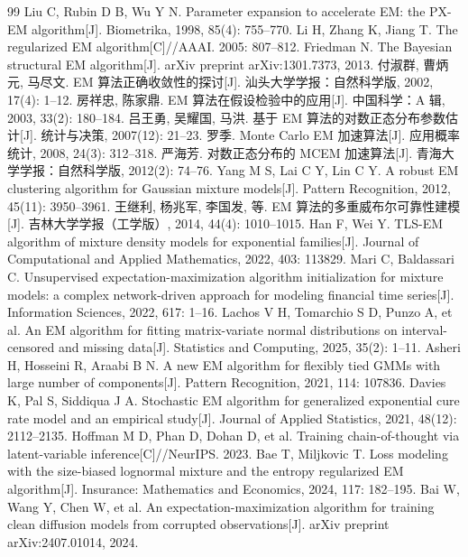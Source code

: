 \documentclass[12pt,a4paper]{ctexart}
\numberwithin{figure}{section}
\numberwithin{table}{section}
\begin{document}
\begin{thebibliography}{99}
   Liu C, Rubin D B, Wu Y N. Parameter expansion to accelerate EM: the PX-EM algorithm[J]. Biometrika, 1998, 85(4): 755--770.
   Li H, Zhang K, Jiang T. The regularized EM algorithm[C]//AAAI. 2005: 807--812.
   Friedman N. The Bayesian structural EM algorithm[J]. arXiv preprint arXiv:1301.7373, 2013.
   付淑群, 曹炳元, 马尽文. EM 算法正确收敛性的探讨[J]. 汕头大学学报：自然科学版, 2002, 17(4): 1--12.
   房祥忠, 陈家鼎. EM 算法在假设检验中的应用[J]. 中国科学：A 辑, 2003, 33(2): 180--184.
   吕王勇, 吴耀国, 马洪. 基于 EM 算法的对数正态分布参数估计[J]. 统计与决策, 2007(12): 21--23.
   罗季. Monte Carlo EM 加速算法[J]. 应用概率统计, 2008, 24(3): 312--318.
   严海芳. 对数正态分布的 MCEM 加速算法[J]. 青海大学学报：自然科学版, 2012(2): 74--76.
   Yang M S, Lai C Y, Lin C Y. A robust EM clustering algorithm for Gaussian mixture models[J]. Pattern Recognition, 2012, 45(11): 3950--3961.
   王继利, 杨兆军, 李国发, 等. EM 算法的多重威布尔可靠性建模[J]. 吉林大学学报（工学版）, 2014, 44(4): 1010--1015.
   Han F, Wei Y. TLS-EM algorithm of mixture density models for exponential families[J]. Journal of Computational and Applied Mathematics, 2022, 403: 113829.
   Mari C, Baldassari C. Unsupervised expectation-maximization algorithm initialization for mixture models: a complex network-driven approach for modeling financial time series[J]. Information Sciences, 2022, 617: 1--16.
   Lachos V H, Tomarchio S D, Punzo A, et al. An EM algorithm for fitting matrix-variate normal distributions on interval-censored and missing data[J]. Statistics and Computing, 2025, 35(2): 1--11.
   Asheri H, Hosseini R, Araabi B N. A new EM algorithm for flexibly tied GMMs with large number of components[J]. Pattern Recognition, 2021, 114: 107836.
   Davies K, Pal S, Siddiqua J A. Stochastic EM algorithm for generalized exponential cure rate model and an empirical study[J]. Journal of Applied Statistics, 2021, 48(12): 2112--2135.
   Hoffman M D, Phan D, Dohan D, et al. Training chain-of-thought via latent-variable inference[C]//NeurIPS. 2023.
   Bae T, Miljkovic T. Loss modeling with the size-biased lognormal mixture and the entropy regularized EM algorithm[J]. Insurance: Mathematics and Economics, 2024, 117: 182--195.
   Bai W, Wang Y, Chen W, et al. An expectation-maximization algorithm for training clean diffusion models from corrupted observations[J]. arXiv preprint arXiv:2407.01014, 2024.

\end{thebibliography}
\end{document}

